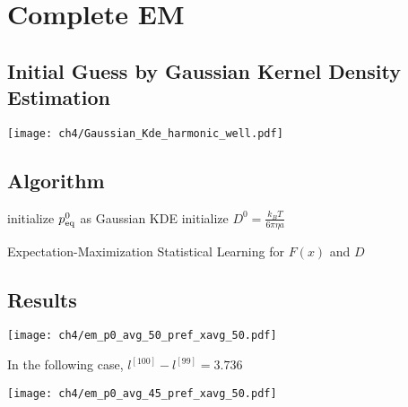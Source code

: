 \section{Complete EM}
\subsection{Initial Guess by Gaussian Kernel Density Estimation}
\begin{center}
    \texttt{[image: ch4/Gaussian\_Kde\_harmonic\_well.pdf]} 
\end{center}

\subsection{Algorithm}
\begin{algorithm}[H]
    \SetAlgoLined
     initialize $p^0_{\rm eq}$ as Gaussian KDE \;
     initialize $D^0=\frac{k_B T}{6\pi \eta a}$\;
     
     \caption{Expectation-Maximization Statistical Learning for $F(x)$ and $D$}
\end{algorithm}

\subsection{Results}
\begin{center}
    \texttt{[image: ch4/em\_p0\_avg\_50\_pref\_xavg\_50.pdf]} 
\end{center}

In the following case, $l^{[100]}-l^{[99]}=3.736$
\begin{center}
    \texttt{[image: ch4/em\_p0\_avg\_45\_pref\_xavg\_50.pdf]} 
\end{center}

